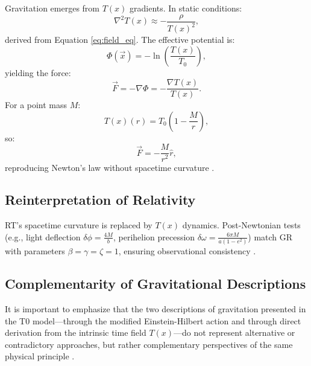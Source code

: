 \documentclass[12pt,a4paper]{article}
\newcommand{\Tfield}{T(x)}
\newcommand{\Tzero}{T_0}
\newcommand{\vecx}{\vec{x}}
\begin{document}
	Gravitation emerges from \(\Tfield\) gradients. In static conditions:
	\begin{equation}
		\nabla^2\Tfield \approx -\frac{\rho}{\Tfield^2},
		\label{eq:static_field}
	\end{equation}
	derived from Equation \ref{eq:field_eq}. The effective potential is:
	\begin{equation}
		\Phi(\vecx) = -\ln\left(\frac{\Tfield}{\Tzero}\right),
		\label{eq:grav_potential_def}
	\end{equation}
	yielding the force:
	\begin{equation}
		\vec{F} = -\nabla\Phi = -\frac{\nabla\Tfield}{\Tfield}.
		\label{eq:force_from_potential}
	\end{equation}
	For a point mass \(M\):
	\begin{equation}
		\Tfield(r) = \Tzero\left(1 - \frac{M}{r}\right),
		\label{eq:time_field_point_mass}
	\end{equation}
	so:
	\begin{equation}
		\vec{F} = -\frac{M}{r^2} \hat{r},
		\label{eq:newton_law}
	\end{equation}
	reproducing Newton’s law without spacetime curvature \cite{pascher_emergente_2025}.
	
	\subsection{Reinterpretation of Relativity}
	\label{subsec:rt_reinterpretation}
	
	RT’s spacetime curvature is replaced by \(\Tfield\) dynamics. Post-Newtonian tests (e.g., light deflection \(\delta\phi = \frac{4M}{b}\), perihelion precession \(\delta\omega = \frac{6\pi M}{a(1-e^2)}\)) match GR with parameters \(\beta = \gamma = \zeta = 1\), ensuring observational consistency \cite{Will2014}.
	
	\subsection{Complementarity of Gravitational Descriptions}
	\label{subsec:grav_complementarity}
	
	It is important to emphasize that the two descriptions of gravitation presented in the T0 model—through the modified Einstein-Hilbert action and through direct derivation from the intrinsic time field $\Tfield$—do not represent alternative or contradictory approaches, but rather complementary perspectives of the same physical principle \cite{pascher_emergente_2025}. 
	
\end{document}
